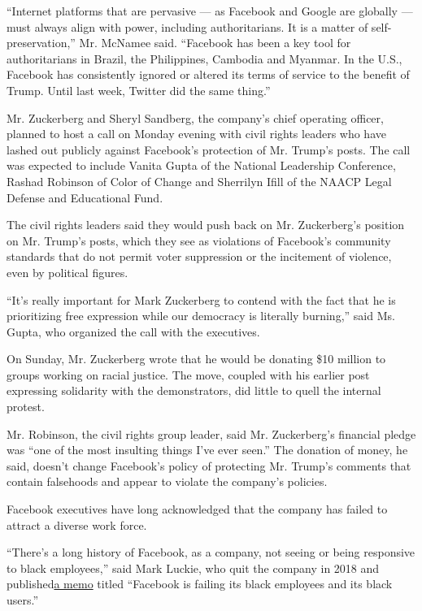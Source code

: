``Internet platforms that are pervasive --- as Facebook and Google are
globally --- must always align with power, including authoritarians. It
is a matter of self-preservation,'' Mr. McNamee said. ``Facebook has
been a key tool for authoritarians in Brazil, the Philippines, Cambodia
and Myanmar. In the U.S., Facebook has consistently ignored or altered
its terms of service to the benefit of Trump. Until last week, Twitter
did the same thing.''

Mr. Zuckerberg and Sheryl Sandberg, the company's chief operating
officer, planned to host a call on Monday evening with civil rights
leaders who have lashed out publicly against Facebook's protection of
Mr. Trump's posts. The call was expected to include Vanita Gupta of the
National Leadership Conference, Rashad Robinson of Color of Change and
Sherrilyn Ifill of the NAACP Legal Defense and Educational Fund.

The civil rights leaders said they would push back on Mr. Zuckerberg's
position on Mr. Trump's posts, which they see as violations of
Facebook's community standards that do not permit voter suppression or
the incitement of violence, even by political figures.

``It's really important for Mark Zuckerberg to contend with the fact
that he is prioritizing free expression while our democracy is literally
burning,'' said Ms. Gupta, who organized the call with the executives.

On Sunday, Mr. Zuckerberg wrote that he would be donating \$10 million
to groups working on racial justice. The move, coupled with his earlier
post expressing solidarity with the demonstrators, did little to quell
the internal protest.

Mr. Robinson, the civil rights group leader, said Mr. Zuckerberg's
financial pledge was ``one of the most insulting things I've ever
seen.'' The donation of money, he said, doesn't change Facebook's policy
of protecting Mr. Trump's comments that contain falsehoods and appear to
violate the company's policies.

Facebook executives have long acknowledged that the company has failed
to attract a diverse work force.

``There's a long history of Facebook, as a company, not seeing or being
responsive to black employees,'' said Mark Luckie, who quit the company
in 2018 and
published\href{https://www.facebook.com/notes/mark-s-luckie/facebook-is-failing-its-black-employees-and-its-black-users/1931075116975013/}{a
memo} titled ``Facebook is failing its black employees and its black
users.''

